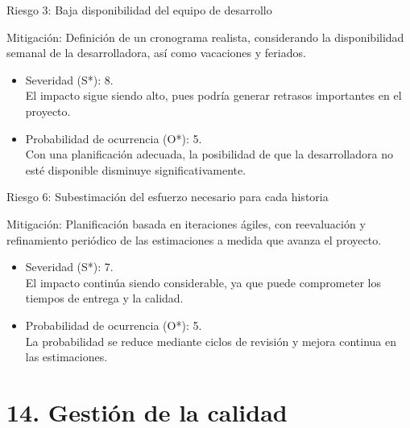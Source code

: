 \documentclass[
11pt, %
]{charter}
\begin{document}
Riesgo 3: Baja disponibilidad del equipo de desarrollo

Mitigación: Definición de un cronograma realista, considerando la disponibilidad semanal de la desarrolladora, así como vacaciones y feriados.
\begin{itemize}
	\item Severidad (S*): 8. \\
	El impacto sigue siendo alto, pues podría generar retrasos importantes en el proyecto.
	\item Probabilidad de ocurrencia (O*): 5. \\
	Con una planificación adecuada, la posibilidad de que la desarrolladora no esté disponible disminuye significativamente.
\end{itemize}   

Riesgo 6: Subestimación del esfuerzo necesario para cada historia

Mitigación: Planificación basada en iteraciones ágiles, con reevaluación y refinamiento periódico de las estimaciones a medida que avanza el proyecto.
\begin{itemize}
	\item Severidad (S*): 7. \\
	El impacto continúa siendo considerable, ya que puede comprometer los tiempos de entrega y la calidad.
	\item Probabilidad de ocurrencia (O*): 5. \\
	La probabilidad se reduce mediante ciclos de revisión y mejora continua en las estimaciones.
\end{itemize}   


\section{14. Gestión de la calidad}
\label{sec:calidad}
\end{document}
